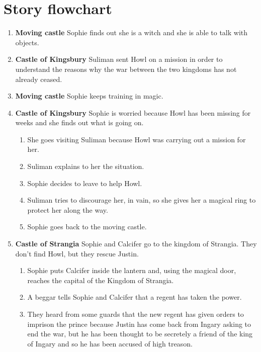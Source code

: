 \section{Story flowchart}

\begin{enumerate}
\item \textbf{Moving castle} Sophie finds out she is a witch and she is able to talk with objects.
  
\item \textbf{Castle of Kingsbury} Suliman sent Howl on a mission in order to understand the reasons why the war between the two kingdoms has not already ceased.
  
\item \textbf{Moving castle} Sophie keeps training in magic.
  
\item \textbf{Castle of Kingsbury} Sophie is worried because Howl has been missing for weeks and she finds out what is going on.
  \begin{enumerate}
  \item She goes visiting Suliman because Howl was carrying out a mission for her.
    
  \item Suliman explains to her the situation.

  \item Sophie decides to leave to help Howl.

  \item Suliman tries to discourage her, in vain, so she gives her a magical ring to protect her along the way.

  \item Sophie goes back to the moving castle.
  \end{enumerate}

\item \textbf{Castle of Strangia} Sophie and Calcifer go to the kingdom of Strangia. They don’t find Howl, but they rescue Justin.

  \begin{enumerate}
  \item Sophie puts Calcifer inside the lantern and, using the magical door, reaches  the capital of the Kingdom of Strangia.
    
  \item A beggar tells Sophie and Calcifer that a regent has taken the power.
    
  \item They heard from some guards that the new regent has given orders to imprison the prince because Justin has come back from Ingary asking to end the war, but he has been thought to be secretely a friend of the king of Ingary and so he has been accused of high treason.
    

\end{enumerate}
\end{enumerate}
